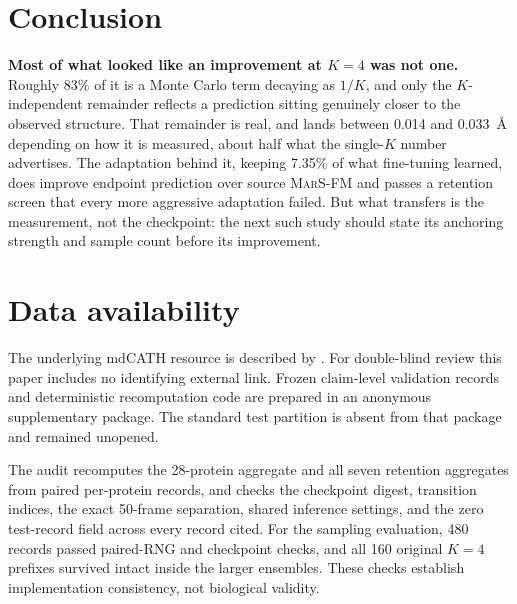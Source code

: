 \documentclass{article}
\newcommand{\marsfm}{\textsc{MarS-FM}}
\begin{document}
\section{Conclusion}

\textbf{Most of what looked like an improvement at $K=4$ was not one.} Roughly 83\% of it is a Monte Carlo term decaying as $1/K$, and only the $K$-independent remainder reflects a prediction sitting genuinely closer to the observed structure. That remainder is real, and lands between 0.014 and 0.033~\AA{} depending on how it is measured, about half what the single-$K$ number advertises. The adaptation behind it, keeping 7.35\% of what fine-tuning learned, does improve endpoint prediction over source \marsfm{} and passes a retention screen that every more aggressive adaptation failed. But what transfers is the measurement, not the checkpoint: the next such study should state its anchoring strength and sample count before its improvement.

\section*{Data availability}

The underlying mdCATH resource is described by \citet{mirarchi2024mdcath}. For double-blind review this paper includes no identifying external link. Frozen claim-level validation records and deterministic recomputation code are prepared in an anonymous supplementary package. The standard test partition is absent from that package and remained unopened.

The audit recomputes the 28-protein aggregate and all seven retention aggregates from paired per-protein records, and checks the checkpoint digest, transition indices, the exact 50-frame separation, shared inference settings, and the zero test-record field across every record cited. For the sampling evaluation, 480 records passed paired-RNG and checkpoint checks, and all 160 original $K=4$ prefixes survived intact inside the larger ensembles. These checks establish implementation consistency, not biological validity.
\end{document}
